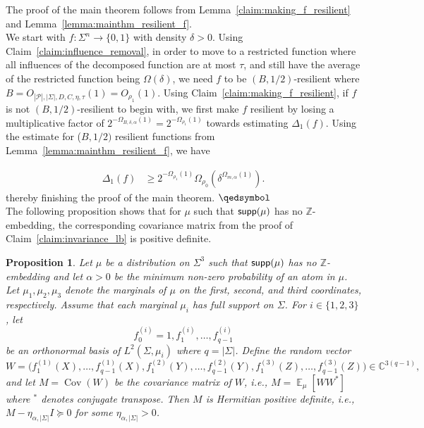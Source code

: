 \documentclass[10pt,a4paper]{amsart}
\newtheorem{proposition}[thm]{Proposition}
\newcommand\Expect[2]{{\mathop{\mathbb{E}}_{#1}\left[ {#2} \right]}}
\renewcommand\geq{\geqslant}
\begin{document}
The proof of the main theorem follows from Lemma~\ref{claim:making_f_resilient} and Lemma~\ref{lemma:mainthm_resilient_f}.\\


 We start with $f:\Sigma^n \rightarrow \{0,1\}$ with density $\delta>0$. Using Claim~\ref{claim:influence_removal}, in order to move to a restricted function where all influences of the decomposed function are at most $\tau$, and still have the average of the restricted function being $\Omega(\delta)$, we need $f$ to be $(B, 1/2)$-resilient where $B = O_{|\mathcal{P}|, |\Sigma|, D, C,\eta, \tau}(1) = O_{\rho_1}(1)$. Using Claim~\ref{claim:making_f_resilient}, if $f$ is not $(B, 1/2)$-resilient to begin with, we first make $f$ resilient by losing a multiplicative factor of $2^{-\Omega_{B, \delta, \alpha}(1)} =  2^{-\Omega_{\rho_1}(1)}$ towards estimating $\Delta_1(f)$. Using the estimate for ($B, 1/2)$ resilient functions from Lemma~\ref{lemma:mainthm_resilient_f}, we have


\begin{align*}
\Delta_1(f) &\geq 2^{-\Omega_{\rho_1}(1)}\Omega_{\rho_0}(\delta^{\Omega_{m,\alpha}(1)}).
\end{align*}
thereby finishing the proof of the main theorem. $\qedsymbol$\\

The following proposition shows that for $\mu$ such that ${\sf supp}(\mu)$ has no $\mathbb{Z}$-embedding, the corresponding covariance matrix from the proof of Claim~\ref{claim:invariance_lb} is positive definite. 

\begin{proposition}\label{prop:positive_definite}
Let $\mu$ be a distribution on $\Sigma^3$ such that ${\sf supp}(\mu)$ has no $\mathbb{Z}$-embedding and let $\alpha>0$ be the minimum non-zero probability of an atom in $\mu$. Let $\mu_1,\mu_2,\mu_3$ denote the marginals of $\mu$ on the first, second, and third coordinates, respectively. Assume that each marginal $\mu_i$ has full support on $\Sigma$. For
$i\in\{1,2,3\}$, let
\[
f^{(i)}_0=1,f^{(i)}_1,\ldots,f^{(i)}_{q-1}
\]
be an orthonormal basis of $L^2(\Sigma,\mu_i)$ where $q=|\Sigma|$. Define the random vector
\[
W=
\bigl(
f^{(1)}_1(X),\ldots,f^{(1)}_{q-1}(X),
f^{(2)}_1(Y),\ldots,f^{(2)}_{q-1}(Y),
f^{(3)}_1(Z),\ldots,f^{(3)}_{q-1}(Z)
\bigr)
\in\mathbb{C}^{3(q-1)},
\]
and let $M=\operatorname{Cov}(W)$ be the covariance matrix of $W$, i.e.,  $M= \Expect{\mu}{ WW^* }$ where $^*$ denotes conjugate transpose. Then $M$ is Hermitian positive definite, i.e., $M-\eta_{\alpha, |\Sigma|}I\succeq 0$ for some $\eta_{\alpha, |\Sigma|}>0$.
\end{proposition}
\end{document}
